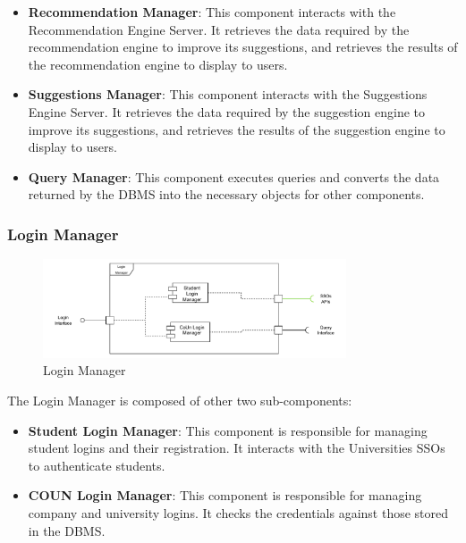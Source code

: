 \begin{itemize}
    \item \textbf{Recommendation Manager}: This component interacts with the Recommendation Engine Server. It retrieves the data
    required by the recommendation engine to improve its suggestions, and retrieves the results of the recommendation engine to display to users. 
    
    \item \textbf{Suggestions Manager}: This component interacts with the Suggestions Engine Server. It retrieves the data
    required by the suggestion engine to improve its suggestions, and retrieves the results of the suggestion engine to display to users.
    
    \item \textbf{Query Manager}: This component executes queries and converts the data returned by the DBMS into the necessary objects for other components.
\end{itemize}

\subsubsection{Login Manager}
\label{subsub:login-manager}

\begin{figure}[H]
      \centering
      \includegraphics[width=0.8\textwidth]{Images/Login_Architecture.pdf}
      \caption{Login Manager}
      \label{login-manager-arch}
\end{figure}

\par The Login Manager is composed of other two sub-components:
\begin{itemize}
      \item \textbf{Student Login Manager}: This component is responsible for managing student logins
            and their registration. It interacts with the Universities SSOs to authenticate students.
      \item \textbf{COUN Login Manager}: This component is responsible for managing company and university logins.
            It checks the credentials against those stored in the DBMS.
\end{itemize}

